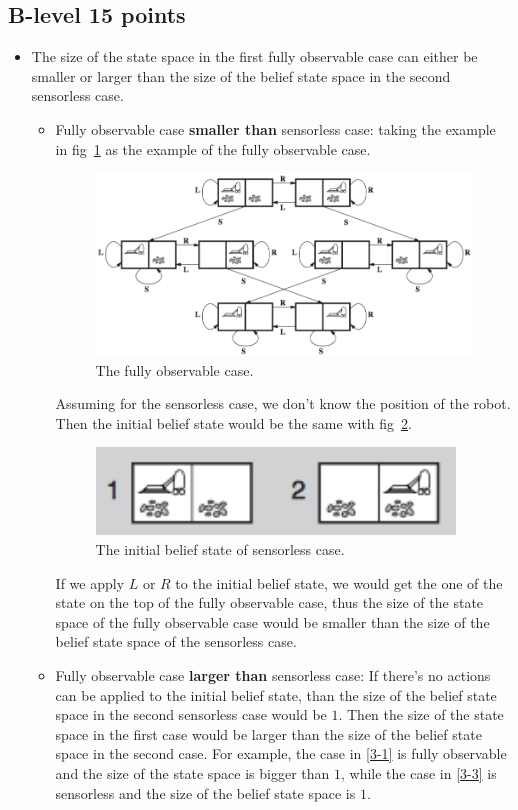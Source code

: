 \documentclass[11pt,a4paper]{article}
\begin{document}
\subsection{B-level 15 points}
\begin{itemize}
	\item The size of the state space in the first fully observable case can either be smaller or larger than the size of the belief state space in the second sensorless case.
	\begin{itemize}
		\item Fully observable case \textbf{smaller than} sensorless case: taking the example in fig~\ref{fig:3-6-1} as the example of the fully observable case.
		\begin{figure}[!htbp]
			\footnotesize
			\centering
			\includegraphics[width=.75\textwidth]{3-6-1}
			\caption{The fully observable case.}
			\label{fig:3-6-1}
		\end{figure}
		\par Assuming for the sensorless case, we don't know the position of the robot. Then the initial belief state would be the same with fig~\ref{fig:3-6-2}.
		\begin{figure}[!htbp]
			\footnotesize
			\centering
			\includegraphics[scale=.5]{3-6-2}
			\caption{The initial belief state of sensorless case.}
			\label{fig:3-6-2}
		\end{figure}
		\par If we apply $L$ or $R$ to the initial belief state, we would get the one of the state on the top of the fully observable case, thus the size of the state space of the fully observable case would be smaller than the size of the belief state space of the sensorless case.
		
		\item Fully observable case \textbf{larger than} sensorless case: If there's no actions can be applied to the initial belief state, than the size of the belief state space in the second sensorless case would be $1$. Then the size of the state space in the first case would be larger than the size of the belief state space in the second case. For example, the case in \ref{3-1} is fully observable and the size of the state space is bigger than $1$, while the case in \ref{3-3} is sensorless and the size of the belief state space is $1$.
	\end{itemize}
	

\end{itemize}
\end{document}
